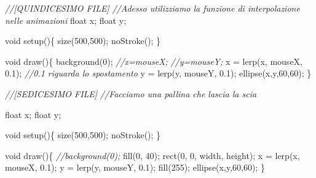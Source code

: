 \documentclass[
]{article}
\newenvironment{Shaded}{}{}
\newcommand{\CommentTok}[1]{\textcolor[rgb]{0.38,0.63,0.69}{\textit{#1}}}
\newcommand{\DataTypeTok}[1]{\textcolor[rgb]{0.56,0.13,0.00}{#1}}
\newcommand{\DecValTok}[1]{\textcolor[rgb]{0.25,0.63,0.44}{#1}}
\newcommand{\FloatTok}[1]{\textcolor[rgb]{0.25,0.63,0.44}{#1}}
\newcommand{\FunctionTok}[1]{\textcolor[rgb]{0.02,0.16,0.49}{#1}}
\newcommand{\NormalTok}[1]{#1}
\newcommand{\OperatorTok}[1]{\textcolor[rgb]{0.40,0.40,0.40}{#1}}
\begin{document}
\begin{Shaded}
\begin{Highlighting}[]
\CommentTok{//[QUINDICESIMO FILE]}
 \CommentTok{//Adesso utilizziamo la funzione di interpolazione nelle animazioni}
\DataTypeTok{float}\NormalTok{ x}\OperatorTok{;}
\DataTypeTok{float}\NormalTok{ y}\OperatorTok{;}

\DataTypeTok{void} \FunctionTok{setup}\OperatorTok{()\{}
    \FunctionTok{size}\OperatorTok{(}\DecValTok{500}\OperatorTok{,}\DecValTok{500}\OperatorTok{);}
    \FunctionTok{noStroke}\OperatorTok{();}
\OperatorTok{\}}

\DataTypeTok{void} \FunctionTok{draw}\OperatorTok{()\{}
    \FunctionTok{background}\OperatorTok{(}\DecValTok{0}\OperatorTok{);}
    \CommentTok{//x=mouseX;  }
    \CommentTok{//y=mouseY;}
\NormalTok{    x }\OperatorTok{=} \FunctionTok{lerp}\OperatorTok{(}\NormalTok{x}\OperatorTok{,}\NormalTok{ mouseX}\OperatorTok{,} \FloatTok{0.1}\OperatorTok{);} \CommentTok{//0.1 riguarda lo spostamento}
\NormalTok{    y }\OperatorTok{=} \FunctionTok{lerp}\OperatorTok{(}\NormalTok{y}\OperatorTok{,}\NormalTok{ mouseY}\OperatorTok{,} \FloatTok{0.1}\OperatorTok{);}
    \FunctionTok{ellipse}\OperatorTok{(}\NormalTok{x}\OperatorTok{,}\NormalTok{y}\OperatorTok{,}\DecValTok{60}\OperatorTok{,}\DecValTok{60}\OperatorTok{);}
\OperatorTok{\}}
\end{Highlighting}
\end{Shaded}

\begin{Shaded}
\begin{Highlighting}[]
\CommentTok{//[SEDICESIMO FILE]}
\CommentTok{//Facciamo una pallina che lascia la scia}

\DataTypeTok{float}\NormalTok{ x}\OperatorTok{;}
\DataTypeTok{float}\NormalTok{ y}\OperatorTok{;}

\DataTypeTok{void} \FunctionTok{setup}\OperatorTok{()\{}
    \FunctionTok{size}\OperatorTok{(}\DecValTok{500}\OperatorTok{,}\DecValTok{500}\OperatorTok{);}
    \FunctionTok{noStroke}\OperatorTok{();}
\OperatorTok{\}}

\DataTypeTok{void} \FunctionTok{draw}\OperatorTok{()\{}
    \CommentTok{//background(0);}
    \FunctionTok{fill}\OperatorTok{(}\DecValTok{0}\OperatorTok{,} \DecValTok{40}\OperatorTok{);}
    \FunctionTok{rect}\OperatorTok{(}\DecValTok{0}\OperatorTok{,} \DecValTok{0}\OperatorTok{,}\NormalTok{ width}\OperatorTok{,}\NormalTok{ height}\OperatorTok{);}
\NormalTok{    x }\OperatorTok{=} \FunctionTok{lerp}\OperatorTok{(}\NormalTok{x}\OperatorTok{,}\NormalTok{ mouseX}\OperatorTok{,} \FloatTok{0.1}\OperatorTok{);}
\NormalTok{    y }\OperatorTok{=} \FunctionTok{lerp}\OperatorTok{(}\NormalTok{y}\OperatorTok{,}\NormalTok{ mouseY}\OperatorTok{,} \FloatTok{0.1}\OperatorTok{);}
    \FunctionTok{fill}\OperatorTok{(}\DecValTok{255}\OperatorTok{);}
    \FunctionTok{ellipse}\OperatorTok{(}\NormalTok{x}\OperatorTok{,}\NormalTok{y}\OperatorTok{,}\DecValTok{60}\OperatorTok{,}\DecValTok{60}\OperatorTok{);}
\OperatorTok{\}}
\end{Highlighting}
\end{Shaded}
\end{document}
